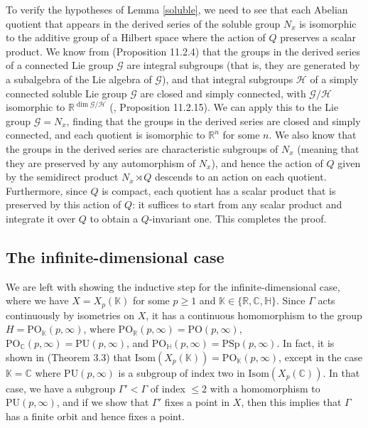\documentclass{article}
\theoremstyle{definition}
\theoremstyle{remark}
\theoremstyle{plain}
\begin{document}
To verify the hypotheses of Lemma \ref{soluble}, we need to see that each Abelian quotient that appears in the derived series of the soluble group $N_x$ is isomorphic to the additive group of a Hilbert space where the action of $Q$ preserves a scalar product. We know from \cite{hilneeb} (Proposition 11.2.4) that the groups in the derived series of a connected Lie group $\mathcal{G}$ are integral subgroups (that is, they are generated by a subalgebra of the Lie algebra of $\mathcal{G}$), and that integral subgroups $\mathcal{H}$ of a simply connected soluble Lie group $\mathcal{G}$ are closed and simply connected, with $\mathcal{G}/\mathcal{H}$ isomorphic to $\mathbb{R}^{\dim{\mathcal{G}/\mathcal{H}}}$ (\cite{hilneeb}, Proposition 11.2.15). We can apply this to the Lie group $\mathcal{G}=N_x$, finding that the groups in the derived series are closed and simply connected, and each quotient is isomorphic to $\mathbb{R}^n$ for some $n$. We also know that the groups in the derived series are characteristic subgroups of $N_x$ (meaning that they are preserved by any automorphism of $N_x$), and hence the action of $Q$ given by the semidirect product $N_x\rtimes Q$ descends to an action on each quotient. Furthermore, since $Q$ is compact, each quotient has a scalar product that is preserved by this action of $Q$: it suffices to start from any scalar product and integrate it over $Q$ to obtain a $Q$-invariant one. This completes the proof. \\

\subsection{The infinite-dimensional case}

We are left with showing the inductive step for the infinite-dimensional case, where we have $X=X_p(\mathbb{K})$ for some $p\geq 1$ and $\mathbb{K}\in\{\mathbb{R},\mathbb{C},\mathbb{H}\}$. Since $\Gamma$ acts continuously by isometries on $X$, it has a continuous homomorphism to the group $H=\mathrm{PO}_\mathbb{K}(p,\infty)$, where $\mathrm{PO}_\mathbb{R}(p,\infty)=\mathrm{PO}(p,\infty)$, $\mathrm{PO}_\mathbb{C}(p,\infty)=\mathrm{PU}(p,\infty)$, and $\mathrm{PO}_\mathbb{H}(p,\infty)=\mathrm{PSp}(p,\infty)$. In fact, it is shown in \cite{duc2023} (Theorem 3.3) that $\mathrm{Isom}(X_p(\mathbb{K}))=\mathrm{PO}_\mathbb{K}(p,\infty)$, except in the case $\mathbb{K}=\mathbb{C}$ where $\mathrm{PU}(p,\infty)$ is a subgroup of index two in $\mathrm{Isom}(X_p(\mathbb{C}))$. In that case, we have a subgroup $\Gamma'<\Gamma$ of index $\leq 2$ with a homomorphism to $\mathrm{PU}(p,\infty)$, and if we show that $\Gamma'$ fixes a point in $X$, then this implies that $\Gamma$ has a finite orbit and hence fixes a point. \\
\end{document}
